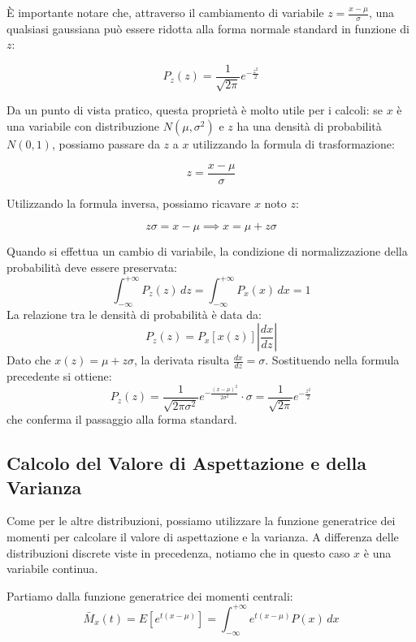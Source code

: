 \documentclass[openany,a4paper,12pt]{book}
\theoremstyle{remark}
\begin{document}
È importante notare che, attraverso il cambiamento di variabile $z = \frac{x-\mu}{\sigma}$, una qualsiasi gaussiana può essere ridotta alla forma normale standard in funzione di $z$:

\begin{equation}
P_z(z) = \frac{1}{\sqrt{2 \pi}} e^{-\frac{z^2}{2}}
\end{equation}

Da un punto di vista pratico, questa proprietà è molto utile per i calcoli: se $x$ è una variabile con distribuzione $N(\mu, \sigma^2)$ e $z$ ha una densità di probabilità $N(0,1)$, possiamo passare da $z$ a $x$ utilizzando la formula di trasformazione:

\begin{equation}
z = \frac{x-\mu}{\sigma}
\end{equation}

Utilizzando la formula inversa, possiamo ricavare $x$ noto $z$:

\begin{equation}
z\sigma = x - \mu \implies x = \mu + z\sigma
\end{equation}

\begin{nota}
Quando si effettua un cambio di variabile, la condizione di normalizzazione della probabilità deve essere preservata:
\[
\int_{-\infty}^{+\infty} P_z(z) \, dz = \int_{-\infty}^{+\infty} P_x(x) \, dx = 1
\]
La relazione tra le densità di probabilità è data da:
\[
P_z(z) = P_x [x(z)] \left| \frac{dx}{dz} \right|
\]
Dato che $x(z) = \mu + z\sigma$, la derivata risulta $\frac{dx}{dz} = \sigma$. Sostituendo nella formula precedente si ottiene:
\[
P_z(z) = \frac{1}{\sqrt{2 \pi \sigma^2}} e^{-\frac{(x-\mu)^2}{2\sigma^2}} \cdot \sigma = \frac{1}{\sqrt{2 \pi}} e^{-\frac{z^2}{2}}
\]
che conferma il passaggio alla forma standard.
\end{nota}

\subsection*{Calcolo del Valore di Aspettazione e della Varianza}

Come per le altre distribuzioni, possiamo utilizzare la funzione generatrice dei momenti per calcolare il valore di aspettazione e la varianza. A differenza delle distribuzioni discrete viste in precedenza, notiamo che in questo caso $x$ è una variabile continua.

Partiamo dalla funzione generatrice dei momenti centrali:
\begin{equation}
\bar{M}_x(t) = E[e^{t(x-\mu)}] = \int_{-\infty}^{+\infty} e^{t(x-\mu)} P(x) \, dx
\end{equation}
\end{document}
